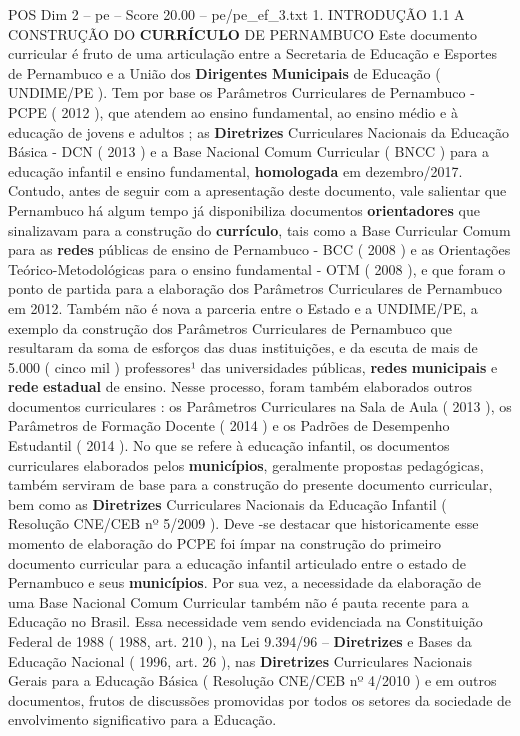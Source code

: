 \begin{textsample}{POS Dim 2 – pe – Score 20.00 – pe/pe\_ef\_3.txt}  \label{ex:f2_pos_254}
1.
INTRODUÇÃO 1.1 A CONSTRUÇÃO DO \textbf{CURRÍCULO} DE PERNAMBUCO Este documento curricular é fruto de uma articulação entre a Secretaria de Educação e Esportes de Pernambuco e a União dos \textbf{Dirigentes} \textbf{Municipais} de Educação ( UNDIME/PE ).
Tem por base os Parâmetros Curriculares de Pernambuco - PCPE ( 2012 ), que atendem ao ensino fundamental, ao ensino médio e à educação de jovens e adultos ; as \textbf{Diretrizes} Curriculares Nacionais da Educação Básica - DCN ( 2013 ) e a Base Nacional Comum Curricular ( BNCC ) para a educação infantil e ensino fundamental, \textbf{homologada} em dezembro/2017.
Contudo, antes de seguir com a apresentação deste documento, vale salientar que Pernambuco há algum tempo já disponibiliza documentos \textbf{orientadores} que sinalizavam para a construção do \textbf{currículo}, tais como a Base Curricular Comum para as \textbf{redes} públicas de ensino de Pernambuco - BCC ( 2008 ) e as Orientações Teórico-Metodológicas para o ensino fundamental - OTM ( 2008 ), e que foram o ponto de partida para a elaboração dos Parâmetros Curriculares de Pernambuco em 2012.
Também não é nova a parceria entre o Estado e a UNDIME/PE, a exemplo da construção dos Parâmetros Curriculares de Pernambuco que resultaram da soma de esforços das duas instituições, e da escuta de mais de 5.000 ( cinco mil ) professores¹ das universidades públicas, \textbf{redes} \textbf{municipais} e \textbf{rede} \textbf{estadual} de ensino.
Nesse processo, foram também elaborados outros documentos curriculares : os Parâmetros Curriculares na Sala de Aula ( 2013 ), os Parâmetros de Formação Docente ( 2014 ) e os Padrões de Desempenho Estudantil ( 2014 ).
No que se refere à educação infantil, os documentos curriculares elaborados pelos \textbf{municípios}, geralmente propostas pedagógicas, também serviram de base para a construção do presente documento curricular, bem como as \textbf{Diretrizes} Curriculares Nacionais da Educação Infantil ( Resolução CNE/CEB nº 5/2009 ).
Deve -se destacar que historicamente esse momento de elaboração do PCPE foi ímpar na construção do primeiro documento curricular para a educação infantil articulado entre o estado de Pernambuco e seus \textbf{municípios}.
Por sua vez, a necessidade da elaboração de uma Base Nacional Comum Curricular também não é pauta recente para a Educação no Brasil.
Essa necessidade vem sendo evidenciada na Constituição Federal de 1988 ( 1988, art. 210 ), na Lei 9.394/96 – \textbf{Diretrizes} e Bases da Educação Nacional ( 1996, art. 26 ), nas \textbf{Diretrizes} Curriculares Nacionais Gerais para a Educação Básica ( Resolução CNE/CEB nº 4/2010 ) e em outros documentos, frutos de discussões promovidas por todos os setores da sociedade de envolvimento significativo para a Educação.

\end{textsample}
